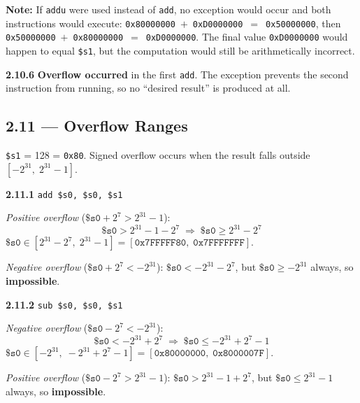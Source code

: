 \begin{flushright}
\begin{minipage}{0.92\linewidth}
\scriptsize
\textbf{Note:}\quad
If \texttt{addu} were used instead of \texttt{add}, no exception would
occur and both instructions would execute:
\texttt{0x80000000}~$+$~\texttt{0xD0000000}~$=$~\texttt{0x50000000},
then \texttt{0x50000000}~$+$~\texttt{0x80000000}~$=$~\texttt{0xD0000000}.
The final value \texttt{0xD0000000} would happen to equal \texttt{\$s1},
but the computation would still be arithmetically incorrect.
\end{minipage}
\end{flushright}

\noindent\textbf{2.10.6}
\textbf{Overflow occurred} in the first \texttt{add}.
The exception prevents the second instruction from running,
so no ``desired result'' is produced at all.

\subsection*{2.11 --- Overflow Ranges}
\hypertarget{sol-2.11}{}

\texttt{\$s1} = 128 = \texttt{0x80}.\quad
Signed overflow occurs when the result falls outside
$[-2^{31},\; 2^{31}-1]$.

\medskip\noindent\textbf{2.11.1} \texttt{add \$s0, \$s0, \$s1}

\noindent\textit{Positive overflow}
($\texttt{\$s0} + 2^{7} > 2^{31}-1$):
\[
  \texttt{\$s0} > 2^{31}-1-2^{7}
  \;\Longrightarrow\;
  \texttt{\$s0} \ge 2^{31}-2^{7}
\]
$\texttt{\$s0} \in [2^{31}-2^{7},\; 2^{31}-1]
= [\texttt{0x7FFFFF80},\; \texttt{0x7FFFFFFF}]$.

\smallskip
\noindent\textit{Negative overflow}
($\texttt{\$s0} + 2^{7} < -2^{31}$):
$\texttt{\$s0} < -2^{31}-2^{7}$,
but $\texttt{\$s0} \ge -2^{31}$ always, so \textbf{impossible}.

\medskip\noindent\textbf{2.11.2} \texttt{sub \$s0, \$s0, \$s1}

\noindent\textit{Negative overflow}
($\texttt{\$s0} - 2^{7} < -2^{31}$):
\[
  \texttt{\$s0} < -2^{31}+2^{7}
  \;\Longrightarrow\;
  \texttt{\$s0} \le -2^{31}+2^{7}-1
\]
$\texttt{\$s0} \in [-2^{31},\; -2^{31}+2^{7}-1]
= [\texttt{0x80000000},\; \texttt{0x8000007F}]$.

\smallskip
\noindent\textit{Positive overflow}
($\texttt{\$s0} - 2^{7} > 2^{31}-1$):
$\texttt{\$s0} > 2^{31}-1+2^{7}$,
but $\texttt{\$s0} \le 2^{31}-1$ always, so \textbf{impossible}.

